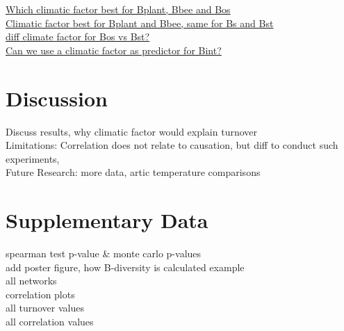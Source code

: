 \documentclass[11pt]{article}
\begin{document}
\begin{figure}[H]
  \label{fig:plant-bee}
\end{figure}



\underline{Which climatic factor best for Bplant, Bbee and Bos} \\

\underline{Climatic factor best for Bplant and Bbee, same for Bs and Bst} \\

\underline{diff climate factor for Bos vs Bst? } \\

\underline{Can we use a climatic factor as predictor for Bint?} \\

\newpage
\section{Discussion} %
Discuss results, why climatic factor would explain turnover \\
Limitations: Correlation does not relate to causation, but diff to conduct such experiments,  \\
Future Research: more data, artic temperature comparisons \\

\section*{Supplementary Data}
spearman test p-value \& monte carlo p-values \\
add poster figure, how B-diversity is calculated example  \\
all networks \\
correlation plots \\
all turnover values \\
all correlation values \\
\end{document}
